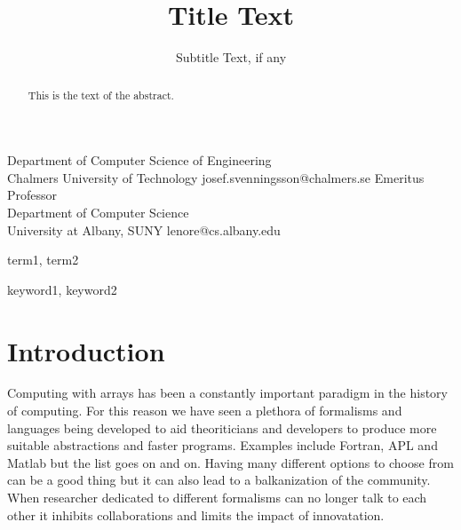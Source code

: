 \documentclass{sigplanconf}
\begin{document}
\setlength{\pdfpageheight}{\paperheight}
\setlength{\pdfpagewidth}{\paperwidth}






\title{Title Text}
\subtitle{Subtitle Text, if any}

           {Department of Computer Science of Engineering\\Chalmers University of Technology}
           {josef.svenningsson@chalmers.se}
           {Emeritus Professor\\Department of Computer Science\\
University at Albany, SUNY}
           {lenore@cs.albany.edu}

\maketitle

\begin{abstract}
This is the text of the abstract.
\end{abstract}


\terms
term1, term2

\keywords
keyword1, keyword2

\section{Introduction}

Computing with arrays has been a constantly important paradigm in the
history of computing. For this reason we have seen a plethora of
formalisms and languages being developed to aid theoriticians and
developers to produce more suitable abstractions and faster programs.
Examples include Fortran, APL and Matlab but the list goes on and on.
Having many different options to choose from can be a good thing but
it can also lead to a balkanization of the community. When researcher
dedicated to different formalisms can no longer talk to each other it
inhibits collaborations and limits the impact of innovatation.
\end{document}
